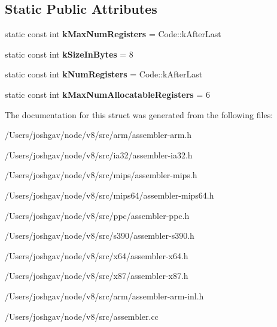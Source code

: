 \subsection*{Static Public Attributes}
\begin{DoxyCompactItemize}
\item 
static const int {\bfseries k\+Max\+Num\+Registers} = Code\+::k\+After\+Last\hypertarget{structv8_1_1internal_1_1_double_register_a2d55a2e349219f13a166d2689bdd5fe9}{}\label{structv8_1_1internal_1_1_double_register_a2d55a2e349219f13a166d2689bdd5fe9}

\item 
static const int {\bfseries k\+Size\+In\+Bytes} = 8\hypertarget{structv8_1_1internal_1_1_double_register_ab4e58fb52126a1eb0092a6fad1df7b7c}{}\label{structv8_1_1internal_1_1_double_register_ab4e58fb52126a1eb0092a6fad1df7b7c}

\item 
static const int {\bfseries k\+Num\+Registers} = Code\+::k\+After\+Last\hypertarget{structv8_1_1internal_1_1_double_register_ae2b54a85e4b4a1021d75a813a504e01d}{}\label{structv8_1_1internal_1_1_double_register_ae2b54a85e4b4a1021d75a813a504e01d}

\item 
static const int {\bfseries k\+Max\+Num\+Allocatable\+Registers} = 6\hypertarget{structv8_1_1internal_1_1_double_register_abed4427acc1e3b1fa020ee030196c3f4}{}\label{structv8_1_1internal_1_1_double_register_abed4427acc1e3b1fa020ee030196c3f4}

\end{DoxyCompactItemize}


The documentation for this struct was generated from the following files\+:\begin{DoxyCompactItemize}
\item 
/\+Users/joshgav/node/v8/src/arm/assembler-\/arm.\+h\item 
/\+Users/joshgav/node/v8/src/ia32/assembler-\/ia32.\+h\item 
/\+Users/joshgav/node/v8/src/mips/assembler-\/mips.\+h\item 
/\+Users/joshgav/node/v8/src/mips64/assembler-\/mips64.\+h\item 
/\+Users/joshgav/node/v8/src/ppc/assembler-\/ppc.\+h\item 
/\+Users/joshgav/node/v8/src/s390/assembler-\/s390.\+h\item 
/\+Users/joshgav/node/v8/src/x64/assembler-\/x64.\+h\item 
/\+Users/joshgav/node/v8/src/x87/assembler-\/x87.\+h\item 
/\+Users/joshgav/node/v8/src/arm/assembler-\/arm-\/inl.\+h\item 
/\+Users/joshgav/node/v8/src/assembler.\+cc\end{DoxyCompactItemize}
